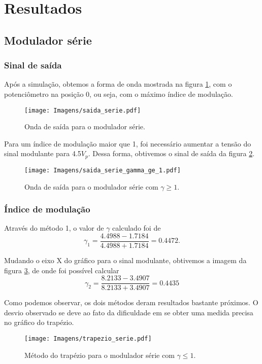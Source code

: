 \newpage
\section{Resultados}

\subsection{Modulador série}

\subsubsection{Sinal de saída}
Após a simulação, obtemos a forma de onda mostrada na figura \ref{f_saida_serie}, com o potenciômetro na posição 0, ou seja, com o máximo índice de modulação.

\begin{figure}[H]
    \centering
    \caption{Onda de saída para o modulador série.}
    \texttt{[image: Imagens/saida\_serie.pdf]}
    \label{f_saida_serie}
\end{figure}

Para um índice de modulação maior que 1, foi necessário aumentar a tensão do sinal modulante para 4.5$V_p$. Dessa forma, obtivemos o sinal de saída da figura \ref{f_saida_serie_gamma_ge_1}.

\begin{figure}[H]
    \centering
    \caption{Onda de saída para o modulador série com $\gamma \ge 1$.}
    \texttt{[image: Imagens/saida\_serie\_gamma\_ge\_1.pdf]}
    \label{f_saida_serie_gamma_ge_1}
\end{figure}

\subsubsection{Índice de modulação}
Através do método 1, o valor de $\gamma$ calculado foi de 
\[ 
\gamma_1 = \frac{4.4988-1.7184}{4.4988+1.7184} = 0.4472.
\]

Mudando o eixo X do gráfico para o sinal modulante, obtivemos a imagem da figura \ref{f_trapezio_serie}, de onde foi possível calcular
\[
\gamma_2 = \frac{8.2133-3.4907}{8.2133+3.4907} = 0.4435
\]

Como podemos observar, os dois métodos deram resultados bastante próximos.
O desvio observado se deve ao fato da dificuldade em se obter uma medida precisa no gráfico do trapézio.

\begin{figure}[H]
	\centering
    \caption{Método do trapézio para o modulador série com $\gamma \le 1$.}
	\texttt{[image: Imagens/trapezio\_serie.pdf]}
	\label{f_trapezio_serie}
\end{figure}

